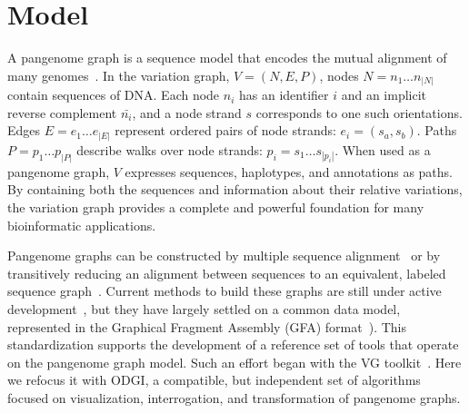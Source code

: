 \documentclass{bioinfo}
\newcommand{\red}[1]{{\textcolor{Red}{#1}}}
\newcommand{\FIXME}[1]{\red{[FIXME: #1]}}
\begin{document}


\section{Model}
A pangenome graph is a sequence model that encodes the mutual alignment of many genomes~\citep{Garrison_2019_thesis,Eizenga_2020}.
In the variation graph, $V = (N, E, P)$, nodes $N = n_1\ldots n_{|N|}$ contain sequences of DNA.
Each node $n_i$ has an identifier $i$ and an implicit reverse complement $\bar{n_i}$, and a node strand $s$ corresponds to one such orientations.
Edges $E = e_1\ldots e_{|E|}$ represent ordered pairs of node strands: $e_i = ( s_a, s_b )$.
Paths $P = p_1\ldots p_{|P|}$ describe walks over node strands: $p_i = s_1 \ldots s_{|p_i|}$.
When used as a pangenome graph, $V$ expresses sequences, haplotypes, and annotations as paths.
By containing both the sequences and information about their relative variations, the variation graph provides a complete and powerful foundation for many bioinformatic applications.

Pangenome graphs can be constructed by multiple sequence alignment~\citep{Lee_2002,Grasso_2004} or by transitively reducing an alignment between sequences to an equivalent, labeled sequence graph~\citep{Kehr_2014,Garrison_2019_thesis}.
Current methods to build these graphs are still under active development~\citep{Li:2020,Armstrong:2020,pggb}, but they have largely settled on a common data model, represented in the Graphical Fragment Assembly (GFA) format~\citep{GFA}).
This standardization supports the development of a reference set of tools that operate on the pangenome graph model.
Such an effort began with the VG toolkit~\citep{Garrison:2018}.
Here we refocus it with ODGI, a compatible, but independent set of algorithms focused on visualization, interrogation, and transformation of pangenome graphs.
\end{document}
